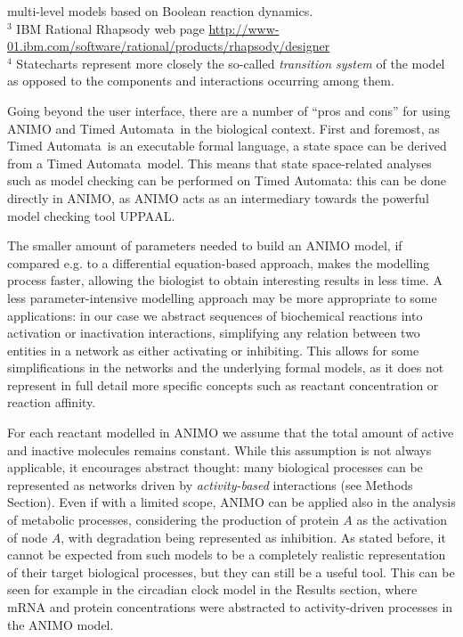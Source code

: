 \documentclass{bmcart}
\def\tas{Timed Automata}
\begin{document}
\begin{table}[!hbt]
{multi-level models based on Boolean reaction dynamics.\\
$^3$ {IBM Rational Rhapsody} web page \protect\url{http://www-01.ibm.com/software/rational/products/rhapsody/designer}\\
$^4$ Statecharts represent more closely the so-called \protect\emph{transition system} of the model as opposed to the components and interactions occurring among them.
\label{tab:tool-comparison}}
\end{table}

Going beyond the user interface, there are a number of ``pros and cons'' for using ANIMO and \tas\
in the biological context. First and foremost, as \tas\ is an executable formal language,
a state space can be derived from a \tas\ model. This means that state space-related analyses
such as model checking can be performed on \tas: this can
be done directly in ANIMO, as
ANIMO acts as an intermediary towards the powerful model checking tool UPPAAL.

The smaller amount of parameters needed to build an ANIMO model, if compared e.g. to
a differential equation-based approach, makes the modelling process faster, allowing
the biologist to obtain interesting results in less time. A less
parameter-intensive modelling approach may be more appropriate to some applications:
in our case we abstract
sequences of biochemical reactions into activation or inactivation interactions,
simplifying any relation between two entities in a network as either activating or
inhibiting. This allows for some simplifications in the networks and the underlying
formal models, as it does not represent in full detail more specific concepts
such as reactant concentration or reaction affinity.

For each reactant modelled in ANIMO we assume that the total amount
of active and inactive molecules remains constant.
While this assumption is not always applicable, it encourages
abstract thought: many biological processes can be represented as networks driven by
\emph{activity-based} interactions (see Methods Section). Even if with a limited scope, ANIMO can be applied
also in the analysis of metabolic processes, considering the production of protein $A$ as
the activation of node $A$, with degradation being represented as inhibition. As stated before,
it cannot be expected from such models to be a completely realistic representation of their target biological
processes, but they can still be a useful tool. This can be seen for example in the circadian clock
model in the Results section, where mRNA and protein concentrations were abstracted to
activity-driven processes in the ANIMO model.
\end{document}
